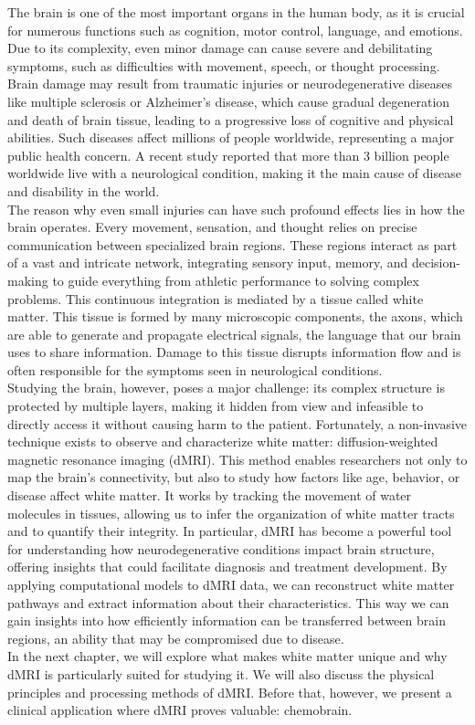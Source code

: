 The brain is one of the most important organs in the human body, as it is crucial for numerous functions such as cognition, motor control, language, and emotions. Due to its complexity, even minor damage can cause severe and debilitating symptoms, such as difficulties with movement, speech, or thought processing.
Brain damage may result from traumatic injuries or neurodegenerative diseases like multiple sclerosis or Alzheimer's disease, which cause gradual degeneration and death of brain tissue, leading to a progressive loss of cognitive and physical abilities. Such diseases affect millions of people worldwide, representing a major public health concern. A recent study \cite{Steinmetz2024} reported that more than 3 billion people worldwide live with a neurological condition, making it the main cause of disease and disability in the world.
\\The reason why even small injuries can have such profound effects lies in how the brain operates. Every movement, sensation, and thought relies on precise communication between specialized brain regions. These regions interact as part of a vast and intricate network, integrating sensory input, memory, and decision-making to guide everything from athletic performance to solving complex problems. This continuous integration is mediated by a tissue called white matter. 
This tissue is formed by many microscopic components, the axons, which are able to generate and propagate electrical signals, the language that our brain uses to share information. Damage to this tissue disrupts information flow and is often responsible for the symptoms seen in neurological conditions.
\\Studying the brain, however, poses a major challenge: its complex structure is protected by multiple layers, making it hidden from view and infeasible to directly access it without causing harm to the patient.
Fortunately, a non-invasive technique exists to observe and characterize white matter: diffusion-weighted magnetic resonance imaging (dMRI). This method enables researchers not only to map the brain's connectivity, but also to study how factors like age, behavior, or disease affect white matter. It works by tracking the movement of water molecules in tissues, allowing us to infer the organization of white matter tracts and to quantify their integrity. In particular, dMRI has become a powerful tool for understanding how neurodegenerative conditions impact brain structure, offering insights that could facilitate diagnosis and treatment development. 
By applying computational models to dMRI data, we can reconstruct white matter pathways and extract information about their characteristics. This way we can gain insights into how efficiently information can be transferred between brain regions, an ability that may be compromised due to disease.
\\In the next chapter, we will explore what makes white matter unique and why dMRI is particularly suited for studying it. We will also discuss the physical principles and processing methods of dMRI. Before that, however, we present a clinical application where dMRI proves valuable: chemobrain.

